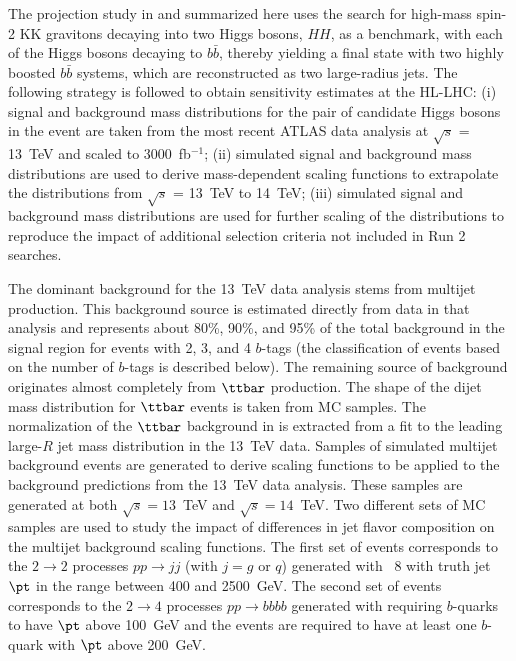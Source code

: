 \subsubsection{}

The projection study in  and summarized here uses the search for high-mass spin-2 KK gravitons decaying into two Higgs bosons, $HH$, as a benchmark, with each of the Higgs bosons decaying to $b\bar{b}$, thereby yielding 
a final state with two highly boosted $b\bar{b}$ systems, which are reconstructed as two large-radius jets.
The following strategy is followed to obtain sensitivity estimates at the HL-LHC: 
(i) signal and background mass distributions for the pair of candidate Higgs bosons in the event 
are taken from the most recent ATLAS data analysis at $\sqrt{s}$ = 13~TeV \cite{ATLAS-Resonance-4b} and scaled to 3000~fb$^{-1}$;
(ii) simulated signal and background mass distributions are used to 
derive mass-dependent scaling functions to extrapolate the distributions
from $\sqrt{s}$ = 13~TeV to 14~TeV;
(iii) simulated signal and background mass distributions are used for further scaling
of the distributions to reproduce the impact of additional selection criteria
not included in Run 2 searches. 

The dominant background for the 13~TeV data analysis stems from multijet production. 
This background source is estimated directly from data in that analysis and represents about 
80\%, 90\%, and 95\% of the total background in the signal region for events with
2, 3, and 4 $b$-tags (the classification of events based on the number of $b$-tags is described below).
The remaining source of background originates almost completely from $\ttbar$ production.
The shape of the dijet mass distribution for $\ttbar$ events is taken from MC samples. 
The normalization of the $\ttbar$ background in  
is extracted from a fit to the leading large-$R$ jet mass distribution in the 13~TeV data.
Samples of simulated multijet background events are generated to derive scaling functions
to be applied to the background predictions from the 13~TeV data analysis.
These samples are generated at both $\sqrt{s} = 13$~TeV and $\sqrt{s} = 14$~TeV.
Two different sets of MC samples are used to study the impact of differences in jet
flavor composition on the multijet background scaling functions.
The first set of events corresponds to the $2 \to 2$ processes $pp \to jj$ (with $j = g$ or $q$)
generated with \PYTHIA~8 with truth jet $\pt$ in the range between 400 and 2500~GeV.
The second set of events corresponds to the $2 \to 4$ processes $pp \to bbbb$ generated
with \MGvATNLO  requiring $b$-quarks to have $\pt$ above 100~GeV and the events are required to have at least one $b$-quark 
with $\pt$ above 200~GeV.

